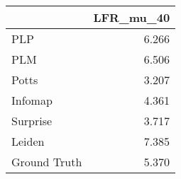 \begin{tabular}{lr}
\toprule
{} & LFR_mu_40 \\
\midrule
PLP          &     6.266 \\
PLM          &     6.506 \\
Potts        &     3.207 \\
Infomap      &     4.361 \\
Surprise     &     3.717 \\
Leiden       &     7.385 \\
Ground Truth &     5.370 \\
\bottomrule
\end{tabular}
